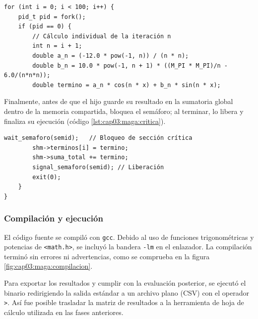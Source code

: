 \begin{lstlisting}[style=C, caption={Creación de los hijos y cálculo del término de Fourier de la iteración $n$.}, label={lst:cap03:maga:hijo}]
for (int i = 0; i < 100; i++) {
    pid_t pid = fork();
    if (pid == 0) {
        // Cálculo individual de la iteración n
        int n = i + 1;
        double a_n = (-12.0 * pow(-1, n)) / (n * n);
        double b_n = 10.0 * pow(-1, n + 1) * ((M_PI * M_PI)/n - 6.0/(n*n*n));
        double termino = a_n * cos(n * x) + b_n * sin(n * x);
\end{lstlisting}

Finalmente, antes de que el hijo guarde su resultado en la sumatoria global dentro de la memoria compartida, bloquea el semáforo; al terminar, lo libera y finaliza su ejecución (código \ref{lst:cap03:maga:critica}).

\begin{lstlisting}[style=C, caption={Sección crítica: acumulación del término en la memoria compartida.}, label={lst:cap03:maga:critica}]
        wait_semaforo(semid);   // Bloqueo de sección crítica
        shm->terminos[i] = termino;
        shm->suma_total += termino;
        signal_semaforo(semid); // Liberación
        exit(0);
    }
}
\end{lstlisting}

\subsubsection{Compilación y ejecución}
\label{sec:cap03:maga:ejecucion}

El código fuente se compiló con \texttt{gcc}. Debido al uso de funciones trigonométricas y potencias de \texttt{<math.h>}, se incluyó la bandera \texttt{-lm} en el enlazador. La compilación terminó sin errores ni advertencias, como se comprueba en la figura \ref{fig:cap03:maga:compilacion}.

Para exportar los resultados y cumplir con la evaluación posterior, se ejecutó el binario redirigiendo la salida estándar a un archivo plano (CSV) con el operador \texttt{>}. Así fue posible trasladar la matriz de resultados a la herramienta de hoja de cálculo utilizada en las fases anteriores.



